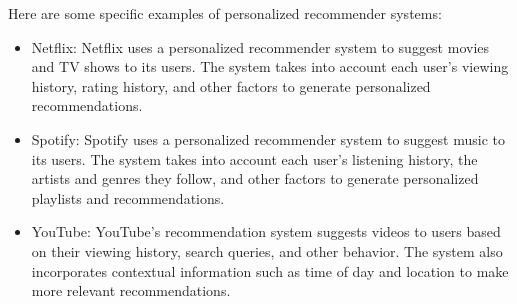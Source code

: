 \documentclass[12pt]{article}
\begin{document}
\begin{enumerate}
Here are some specific examples of personalized recommender systems:
\begin{itemize}
    \item Netflix: Netflix uses a personalized recommender system to suggest movies and TV shows to its users. The system takes into account each user's viewing history, rating history, and other factors to generate personalized recommendations.
    \item Spotify: Spotify uses a personalized recommender system to suggest music to its users. The system takes into account each user's listening history, the artists and genres they follow, and other factors to generate personalized playlists and recommendations.
    \item YouTube: YouTube's recommendation system suggests videos to users based on their viewing history, search queries, and other behavior. The system also incorporates contextual information such as time of day and location to make more relevant recommendations.
\end{itemize}


\end{enumerate}
\end{document}
